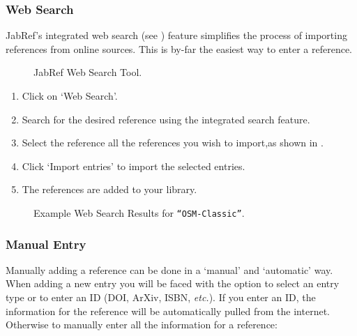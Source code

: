 			\subsubsection{Web Search}
				JabRef's integrated web search (see ) feature simplifies the process of importing references from online sources.
				This is by-far the easiest way to enter a reference.
				
				\begin{figure}[htbp]
					\centering
					\caption{JabRef Web Search Tool.}
					\label{fig:JabRefWebSearch}
				\end{figure}
				
				\begin{enumerate}
					\item Click on `Web Search'.
					\item Search for the desired reference using the integrated search feature.
					\item Select the reference all the references you wish to import,as shown in .
					\item Click `Import entries' to import the selected entries.
					\item The references are added to your library.
				\end{enumerate}
				
				\begin{figure}[htbp]
					\centering
					\caption{Example Web Search Results for \texttt{``OSM-Classic''}.}
					\label{fig:JabRefWebSearchResults}
				\end{figure}
				
				
			\subsubsection{Manual Entry}
				Manually adding a reference can be done in a `manual' and `automatic' way.
				When adding a new entry you will be faced with the option to select an entry type or to enter an ID (DOI, ArXiv, ISBN, \textit{etc.}).
				If you enter an ID, the information for the reference will be automatically pulled from the internet.
				Otherwise to manually enter all the information for a reference:

